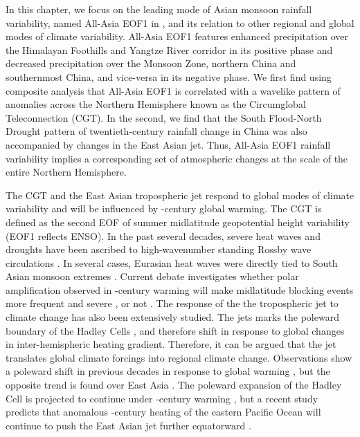 	In this chapter, we focus on the leading mode of Asian monsoon rainfall variability, named All-Asia EOF1 in \citet{Day2015}, and its relation to other regional and global modes of climate variability. All-Asia EOF1 features enhanced precipitation over the Himalayan Foothills and Yangtze River corridor in its positive phase and decreased precipitation over the Monsoon Zone, northern China and southernmost China, and vice-versa in its negative phase. We first find using composite analysis that All-Asia EOF1 is correlated with a wavelike pattern of anomalies across the Northern Hemisphere known as the Circumglobal Teleconnection (CGT). In the second, we find that the South Flood-North Drought pattern of twentieth-century rainfall change in China was also accompanied by changes in the East Asian jet. Thus, All-Asia EOF1 rainfall variability implies a corresponding set of atmospheric changes at the scale of the entire Northern Hemisphere.
	
	The CGT and the East Asian tropospheric jet respond to global modes of climate variability and will be influenced by -century global warming. The CGT is defined as the second EOF of summer midlatitude geopotential height variability (EOF1 reflects ENSO). In the past several decades, severe heat waves and droughts have been ascribed to high-wavenumber standing Rossby wave circulations \citep{Schubert2011}. In several cases, Eurasian heat waves were directly tied to South Asian monsoon extremes \citep{Lau2012,Trenberth2012}. Current debate investigates whether polar amplification observed in -century warming will make midlatitude blocking events more frequent and severe \citep{Francis2012}, or not \citep{Barnes2013,Hassanzadeh2014a}. The response of the the tropospheric jet to climate change has also been extensively studied. The jets marks the poleward boundary of the Hadley Cells \citep{Bordoni2008}, and therefore shift in response to global changes in inter-hemispheric heating gradient\citep{Chiang2012}. Therefore, it can be argued that the jet translates global climate forcings into regional climate change. Observations show a poleward shift in previous decades in response to global warming \citep{Fu2006,Archer2008,Fu2011}, but the opposite trend is found over East Asia \citep{Yu2007, Archer2008,Park2014a}. The poleward expansion of the Hadley Cell is projected to continue under -century warming \citep{Frierson2007,Lu2007,Kang2012}, but a recent study predicts that anomalous -century heating of the eastern Pacific Ocean will continue to push the East Asian jet further equatorward \citep{Park2014}.
	

